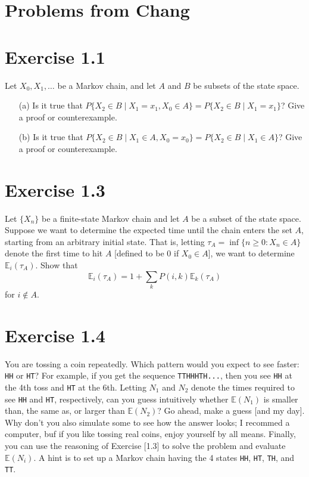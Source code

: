 \documentclass{article}
\begin{document}
\section*{Problems from Chang}

\section*{Exercise 1.1}
Let $X_0, X_1, \ldots$ be a Markov chain, and let $A$ and $B$ be subsets of the state space.

\begin{enumerate}
    \item[(a)] Is it true that $P\{X_2 \in B \mid X_1 = x_1, X_0 \in A\} = P\{X_2 \in B \mid X_1 = x_1\}$? Give a proof or counterexample.
    \item[(b)] Is it true that $P\{X_2 \in B \mid X_1 \in A, X_0 = x_0\} = P\{X_2 \in B \mid X_1 \in A\}$? Give a proof or counterexample.
\end{enumerate}

\section*{Exercise 1.3} 
Let $\{X_n\}$ be a finite-state Markov chain
and let $A$ be a subset of the state space. Suppose we want to
determine the expected time until the chain enters the set $A$,
starting from an arbitrary initial state. That is, letting $\tau_A =
\inf\{n \geq 0 : X_n \in A\}$ denote the first time to hit $A$
[defined to be $0$ if $X_0 \in A$], we want to determine
$\mathbb{E}_i(\tau_A)$. Show that \[ \mathbb{E}_i(\tau_A) = 1 + \sum_k P(i, k)
\mathbb{E}_k(\tau_A) \] for $i \notin A$.

\section*{Exercise 1.4} 
You are tossing a coin repeatedly. Which
pattern would you expect to see faster: \texttt{HH} or \texttt{HT}?
For example, if you get the sequence \texttt{TTHHHTH...}, then you
see \texttt{HH} at the 4th toss and \texttt{HT} at the 6th. Letting
$N_1$ and $N_2$ denote the times required to see \texttt{HH} and
\texttt{HT}, respectively, can you guess intuitively whether $\mathbb{E}(N_1)$
is smaller than, the same as, or larger than $\mathbb{E}(N_2)$? Go ahead, make
a guess [and my day]. Why don’t you also simulate some to see how the answer
looks; I recommed a computer, buf if you like tossing real coins, enjoy yourself by all means. Finally, you can use the reasoning of Exercise [1.3] to solve the
problem and evaluate $\mathbb{E}(N_i)$. A hint is to set up a Markov chain
having the 4 states \texttt{HH}, \texttt{HT}, \texttt{TH}, and
\texttt{TT}.
\end{document}
